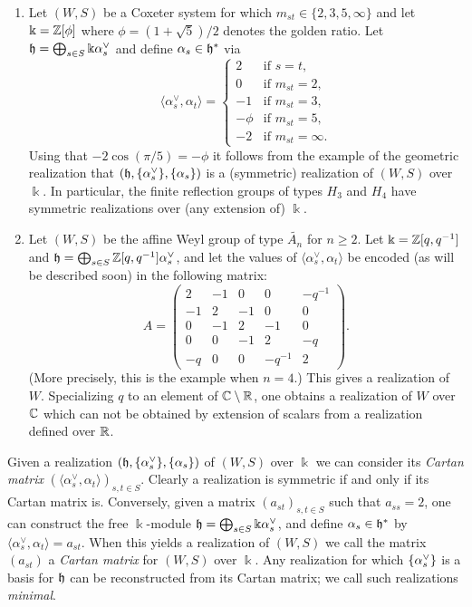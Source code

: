\begin{ex}
\begin{enumerate}
\item Let $(W,S)$ be a Coxeter system for  which $m_{st} \in \{ 2,3,5,\infty\}$ and let $\Bbbk = {\mathbb{Z}}[\phi]$ where $\phi = (1 + \sqrt{5})/2$ denotes the golden ratio. Let ${\mathfrak h} = \bigoplus_{s \in S} \Bbbk \alpha_s^{\vee}$ and define $\alpha_s \in {\mathfrak h}^*$ via
\[
\langle \alpha_s^\vee, \alpha_t \rangle = \begin{cases} 2 & \text{if $s = t$,} \\ 0 & \text{if $m_{st} =2 ,$} \\ -1 & \text{if $m_{st} =3 ,$} \\ -\phi & \text{if $m_{st} =5,$} \\ -2 & \text{if $m_{st} =\infty.$} \end{cases}
\]
Using that $-2\cos(\pi/5) = -\phi$ it follows from the example of the geometric realization that $({\mathfrak h}, \{ \alpha_s^{\vee} \}, \{ \alpha_s \})$ is a (symmetric) realization of $(W,S)$ over $\Bbbk$. In particular, the finite reflection groups of types $H_3$ and $H_4$ have symmetric realizations over (any extension of) $\Bbbk$.

\item Let $(W,S)$ be the affine Weyl group of type $\widetilde{A_n}$ for $n \ge 2$. Let $\Bbbk = {\mathbb{Z}}[q,q^{-1}]$ and ${\mathfrak h} = \bigoplus_{s \in S} {\mathbb{Z}}[q,q^{-1}] \alpha_s^{\vee}$, and let the values of
$\langle \alpha_s^\vee, \alpha_t \rangle$ be encoded (as will be described soon) in the following matrix: \[A = \left( \begin{array}{ccccc} 2 & -1 & 0 & 0 & -q^{-1} \\ -1 & 2 & -1 & 0 & 0
\\ 0 & -1 & 2 & -1 & 0 \\ 0 & 0 & -1 & 2 & -q \\ -q & 0 & 0 & -q^{-1} & 2 \end{array} \right).\] 
(More precisely, this is the example when $n = 4$.)
This gives a realization of $W$. Specializing $q$ to an element of ${\mathbb{C}} \setminus {\mathbb{R}}$, one
obtains a realization of $W$ over ${\mathbb{C}}$ which can not be obtained by extension of scalars from a realization defined over ${\mathbb{R}}$.
\end{enumerate}
\end{ex}

Given a realization $({\mathfrak h}, \{\alpha_s^{\vee} \}, \{\alpha_s\})$ of $(W,S)$ over $\Bbbk$ we can consider its \emph{Cartan matrix} $(\langle \alpha_s^\vee, \alpha_t \rangle ) _{s,t \in S}$.
Clearly a realization is symmetric if and only if its Cartan matrix is. Conversely, given a matrix $(a_{st})_{s,t \in S}$ such that $a_{ss}=2$, one can construct the free $\Bbbk$-module
${\mathfrak h} = \bigoplus_{s \in S} \Bbbk \alpha_s^{\vee}$, and define $\alpha_s \in {\mathfrak h}^*$ by $\langle \alpha_s^\vee, \alpha_t \rangle = a_{st}$. When this yields a realization of $(W,S)$ we call
the matrix $(a_{st})$ a \emph{Cartan matrix} for $(W,S)$ over $\Bbbk$. Any realization for which $\{\alpha_s^\vee\}$ is a basis for ${\mathfrak h}$ can be reconstructed from its Cartan matrix; we call
such realizations \emph{minimal}.

